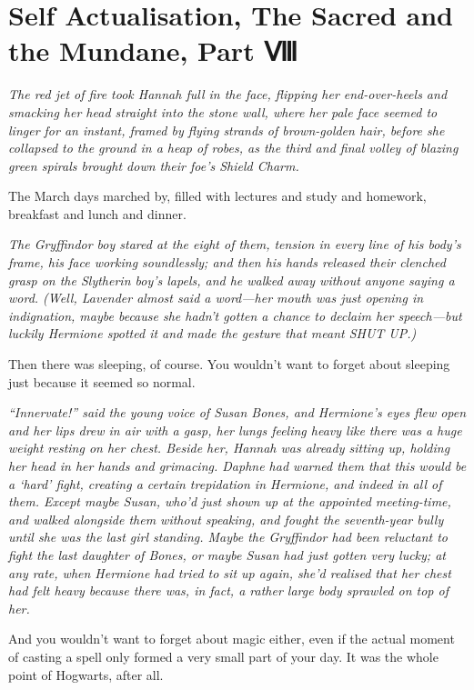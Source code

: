 \chapter{Self Actualisation, The Sacred and the Mundane, Part
Ⅷ}\label{self-actualisation-the-sacred-and-the-mundane-part}

\emph{The red jet of fire took Hannah full in the face, flipping her
end-over-heels and smacking her head straight into the stone wall, where
her pale face seemed to linger for an instant, framed by flying strands
of brown-golden hair, before she collapsed to the ground in a heap of
robes, as the third and final volley of blazing green spirals brought
down their foe's Shield Charm.}

The March days marched by, filled with lectures and study and homework,
breakfast and lunch and dinner.

\emph{The Gryffindor boy stared at the eight of them, tension in every
line of his body's frame, his face working soundlessly; and then his
hands released their clenched grasp on the Slytherin boy's lapels, and
he walked away without anyone saying a word. (Well, Lavender almost said
a word---her mouth was just opening in indignation, maybe because she
hadn't gotten a chance to declaim her speech---but luckily Hermione
spotted it and made the gesture that meant SHUT UP.)}

Then there was sleeping, of course. You wouldn't want to forget about
sleeping just because it seemed so normal.

\emph{``Innervate!'' said the young voice of Susan Bones, and Hermione's
eyes flew open and her lips drew in air with a gasp, her lungs feeling
heavy like there was a huge weight resting on her chest. Beside her,
Hannah was already sitting up, holding her head in her hands and
grimacing. Daphne had warned them that this would be a `hard' fight,
creating a certain trepidation in Hermione, and indeed in all of them.
Except maybe Susan, who'd just shown up at the appointed meeting-time,
and walked alongside them without speaking, and fought the seventh-year
bully until she was the last girl standing. Maybe the Gryffindor had
been reluctant to fight the last daughter of Bones, or maybe Susan had
just gotten very lucky; at any rate, when Hermione had tried to sit up
again, she'd realised that her chest had felt heavy because there was,
in fact, a rather large body sprawled on top of her.}

And you wouldn't want to forget about magic either, even if the actual
moment of casting a spell only formed a very small part of your day. It
was the whole point of Hogwarts, after all.

